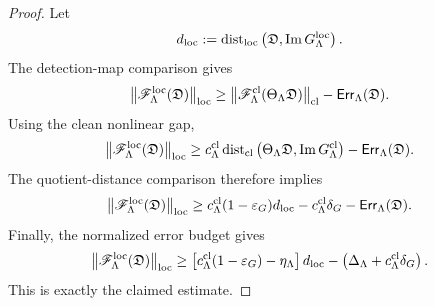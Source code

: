 \documentclass[11pt]{article}
\numberwithin{equation}{section}
\newcommand{\eps}{\varepsilon}
\newcommand{\Err}{\mathsf{Err}}
\newcommand{\Image}{\operatorname{Im}}
\newcommand{\Dist}{\operatorname{dist}}
\begin{document}
\begin{proof}
Let
\[
        d_{\rm loc}
        :=
        \Dist_{\rm loc}
        \left(
        \mathfrak D,
        \Image G_\Lambda^{\rm loc}
        \right).
\]
The detection-map comparison gives
\[
        \left\|
        \mathscr F_\Lambda^{\rm loc}(\mathfrak D)
        \right\|_{\rm loc}
        \ge
        \left\|
        \mathscr F_\Lambda^{\rm cl}
        (\Theta_\Lambda\mathfrak D)
        \right\|_{\rm cl}
        -
        \Err_\Lambda(\mathfrak D).
\]
Using the clean nonlinear gap,
\[
        \left\|
        \mathscr F_\Lambda^{\rm loc}(\mathfrak D)
        \right\|_{\rm loc}
        \ge
        c_\Lambda^{\rm cl}
        \Dist_{\rm cl}
        \left(
        \Theta_\Lambda\mathfrak D,
        \Image G_\Lambda^{\rm cl}
        \right)
        -
        \Err_\Lambda(\mathfrak D).
\]
The quotient-distance comparison therefore implies
\[
        \left\|
        \mathscr F_\Lambda^{\rm loc}(\mathfrak D)
        \right\|_{\rm loc}
        \ge
        c_\Lambda^{\rm cl}(1-\eps_G)d_{\rm loc}
        -
        c_\Lambda^{\rm cl}\delta_G
        -
        \Err_\Lambda(\mathfrak D).
\]
Finally, the normalized error budget gives
\[
        \left\|
        \mathscr F_\Lambda^{\rm loc}(\mathfrak D)
        \right\|_{\rm loc}
        \ge
        \left[
        c_\Lambda^{\rm cl}(1-\eps_G)-\eta_\Lambda
        \right]d_{\rm loc}
        -
        \left(
        \Delta_\Lambda+c_\Lambda^{\rm cl}\delta_G
        \right).
\]
This is exactly the claimed estimate.
\end{proof}
\end{document}
